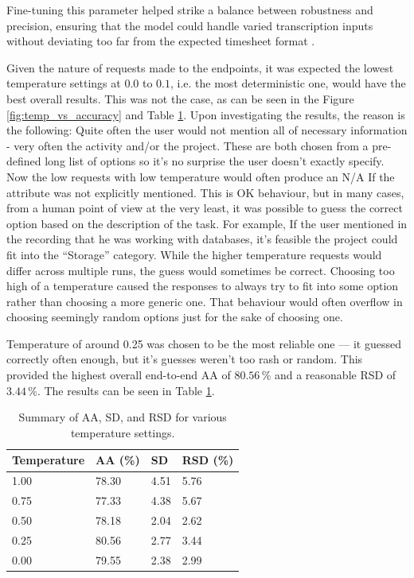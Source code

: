 \documentclass[
  digital,     %
  oneside,     %
  nosansbold,  %
  nocolorbold, %
  lof,         %
  lot,         %
]{fithesis4}
\begin{document}
Fine-tuning this parameter helped strike a balance between robustness and precision, ensuring that the model could handle varied transcription inputs without deviating too far from the expected timesheet format \cite{openaiTemp}.

Given the nature of requests made to the endpoints, it was expected the lowest temperature settings at $0.0$ to $0.1$, i.e. the most deterministic one, would have the best overall results. This was not the case, as can be seen in the Figure \ref{fig:temp_vs_accuracy} and Table \ref{tab:temperature_summary}. Upon investigating the results, the reason is the following: Quite often the user would not mention all of necessary information - very often the activity and/or the project. These are both chosen from a pre-defined long list of options so it's no surprise the user doesn't exactly specify. Now the low requests with low temperature would often produce an \gls{N/A} If the attribute was not explicitly mentioned. This is OK behaviour, but in many cases, from a human point of view at the very least, it was possible to guess the correct option based on the description of the task. For example, If the user mentioned in the recording that he was working with databases, it's feasible the project could fit into the ``Storage'' category. While the higher temperature requests would differ across multiple runs, the guess would sometimes be correct. Choosing too high of a temperature caused the responses to always try to fit into some option rather than choosing a more generic one. That behaviour would often overflow in choosing seemingly random options just for the sake of choosing one.

Temperature of around 0.25 was chosen to be the most reliable one --- it guessed correctly often enough, but it's guesses weren't too rash or random. This provided the highest overall end-to-end \gls{AA} of $80.56$\,\% and a reasonable \gls{RSD} of $3.44$\,\%. The results can be seen in Table \ref{tab:temperature_summary}.

\begin{table}[h!]
  \centering
  \begin{tabularx}{\textwidth}{lXXX}
    \toprule
    \textbf{Temperature} & \textbf{\gls{AA} (\%)} & \textbf{\gls{SD}} & \textbf{\gls{RSD} (\%)} \\
    \midrule
    1.00  & 78.30 & 4.51 & 5.76 \\
    0.75  & 77.33 & 4.38 & 5.67 \\
    0.50  & 78.18 & 2.04 & 2.62 \\
    0.25  & 80.56 & 2.77 & 3.44 \\
    0.00  & 79.55 & 2.38 & 2.99 \\
    \bottomrule
  \end{tabularx}
  \caption{Summary of \gls{AA}, \gls{SD}, and \gls{RSD} for various temperature settings.}
  \label{tab:temperature_summary}
\end{table}
\end{document}
